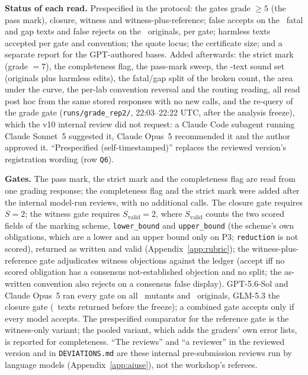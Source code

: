 \textbf{Status of each read.} Prespecified in the protocol: the gates grade $\ge 5$ (the pass mark), closure, witness and witness-plus-reference; false accepts on the \CRNBroken\ fatal and gap texts and false rejects on the \CRNPerClass\ originals, per gate; harmless texts accepted per gate and convention; the quote locus; the certificate size; and a separate report for the GPT-authored bases. Added afterwards: the strict mark (grade $=7$), the completeness flag, the pass-mark sweep, the \CRNSound-text sound set (originals plus harmless edits), the fatal/gap split of the broken count, the area under the curve, the per-lab convention reversal and the routing reading, all read post hoc from the same stored responses with no new calls, and the re-query of the grade gate (\texttt{runs/\allowbreak grade\_rep2/\allowbreak }, 22:03--22:22 UTC, after the analysis freeze), which the v10 internal review did not request: a Claude Code subagent running Claude Sonnet~5 suggested it, Claude Opus~5 recommended it and the author approved it. ``Prespecified (self-timestamped)'' replaces the reviewed version's registration wording (row \texttt{Q6}).

\textbf{Gates.} The pass mark, the strict mark and the completeness flag are read from one grading response; the completeness flag and the strict mark were added after the internal model-run reviews, with no additional calls. The closure gate requires $S{=}2$; the witness gate requires $S_{\mathrm{valid}}{=}2$, where $S_{\mathrm{valid}}$ counts the two scored fields of the marking scheme, \texttt{lower\_bound} and \texttt{upper\_bound} (the scheme's own obligations, which are a lower and an upper bound only on P3; \texttt{reduction} is not scored), returned as written and valid (Appendix~\ref{app:rubric}); the witness-plus-reference gate adjudicates witness objections against the ledger (accept iff no scored obligation has a consensus not-established objection and no split; the as-written convention also rejects on a consensus false display). GPT-5.6-Sol and Claude Opus~5 ran every gate on all \CRNMutants\ mutants and \CRNBases\ originals, GLM-5.3 the closure gate (\PLANTGLMCOV\ texts returned before the freeze); a combined gate accepts only if every model accepts. The prespecified comparator for the reference gate is the witness-only variant; the pooled variant, which adds the graders' own error lists, is reported for completeness. ``The reviews'' and ``a reviewer'' in the reviewed version and in \texttt{DEVIATIONS.md} are these internal pre-submission reviews run by language models (Appendix~\ref{app:aiuse}), not the workshop's referees.

